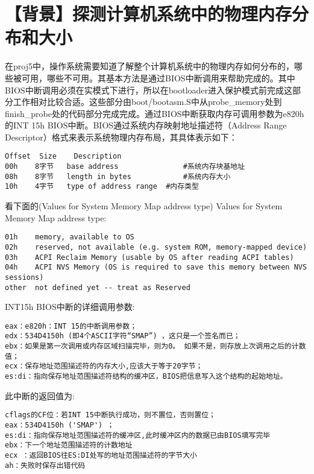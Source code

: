 \section{【背景】探测计算机系统中的物理内存分布和大小}\label{ux80ccux666fux63a2ux6d4bux8ba1ux7b97ux673aux7cfbux7edfux4e2dux7684ux7269ux7406ux5185ux5b58ux5206ux5e03ux548cux5927ux5c0f}

在proj5中，操作系统需要知道了解整个计算机系统中的物理内存如何分布的，哪些被可用，哪些不可用。其基本方法是通过BIOS中断调用来帮助完成的。其中BIOS中断调用必须在实模式下进行，所以在bootloader进入保护模式前完成这部分工作相对比较合适。这些部分由boot/bootasm.S中从probe\_memory处到finish\_probe处的代码部分完成完成。通过BIOS中断获取内存可调用参数为e820h的INT
15h BIOS中断。BIOS通过系统内存映射地址描述符（Address Range
Descriptor）格式来表示系统物理内存布局，其具体表示如下：

\begin{lstlisting}
Offset  Size    Description     
00h    8字节   base address               #系统内存块基地址
08h    8字节   length in bytes            #系统内存大小
10h    4字节   type of address range  #内存类型
\end{lstlisting}

看下面的(Values for System Memory Map address type) Values for System
Memory Map address type:

\begin{lstlisting}
01h    memory, available to OS
02h    reserved, not available (e.g. system ROM, memory-mapped device)
03h    ACPI Reclaim Memory (usable by OS after reading ACPI tables)
04h    ACPI NVS Memory (OS is required to save this memory between NVS sessions)
other  not defined yet -- treat as Reserved
\end{lstlisting}

INT15h BIOS中断的详细调用参数:

\begin{lstlisting}
eax：e820h：INT 15的中断调用参数；
edx：534D4150h (即4个ASCII字符“SMAP”) ，这只是一个签名而已；
ebx：如果是第一次调用或内存区域扫描完毕，则为0。 如果不是，则存放上次调用之后的计数值；
ecx：保存地址范围描述符的内存大小,应该大于等于20字节；
es:di：指向保存地址范围描述符结构的缓冲区，BIOS把信息写入这个结构的起始地址。
\end{lstlisting}

此中断的返回值为:

\begin{lstlisting}
cflags的CF位：若INT 15中断执行成功，则不置位，否则置位； 
eax：534D4150h ('SMAP') ；
es:di：指向保存地址范围描述符的缓冲区,此时缓冲区内的数据已由BIOS填写完毕 
ebx：下一个地址范围描述符的计数地址 
ecx ：返回BIOS往ES:DI处写的地址范围描述符的字节大小 
ah：失败时保存出错代码
\end{lstlisting}

